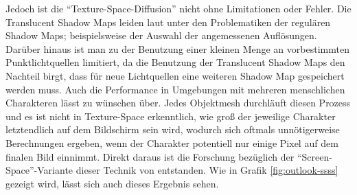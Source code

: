 \documentclass[ngerman,runningheads,a4paper]{llncs}[2018/03/10]
\begin{document}
Jedoch ist die \enquote{Texture-Space-Diffusion} nicht ohne Limitationen oder Fehler.
Die Translucent Shadow Maps leiden laut \citet{efficient-human-skin-rendering} unter den Problematiken der regulären Shadow Maps; beispielsweise der Auswahl der angemessenen Auflösungen.
Darüber hinaus ist man zu der Benutzung einer kleinen Menge an vorbestimmten Punktlichtquellen limitiert, da die Benutzung der Translucent Shadow Maps den Nachteil birgt, dass für neue Lichtquellen eine weiteren Shadow Map gespeichert werden muss.
Auch die Performance in Umgebungen mit mehreren menschlichen Charakteren lässt zu wünschen über.
Jedes Objektmesh durchläuft diesen Prozess und es ist nicht in Texture-Space erkenntlich, wie groß der jeweilige Charakter letztendlich auf dem Bildschirm sein wird, wodurch sich oftmals unnötigerweise Berechnungen ergeben, wenn der Charakter potentiell nur einige Pixel auf dem finalen Bild einnimmt.
Direkt daraus ist die Forschung bezüglich der \enquote{Screen-Space}-Variante dieser Technik von \citet{screen-space-subsurface} entstanden.
Wie in Grafik \ref{fig:outlook-ssss} gezeigt wird, lässt sich auch dieses Ergebnis sehen.
\end{document}
